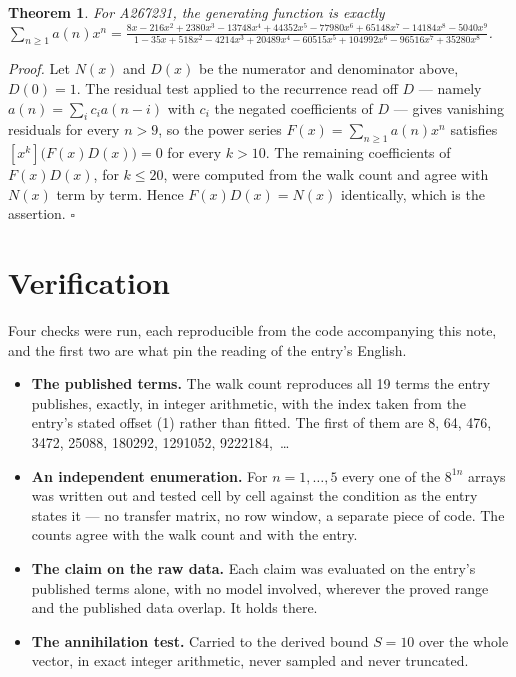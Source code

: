 \documentclass[11pt]{article}
\newtheorem{theorem}{Theorem}
\theoremstyle{definition}
\begin{document}
\begin{theorem} For A267231, the generating function is exactly $\sum_{n\ge 1} a(n)x^n = \frac{8x - 216x^{2} + 2380x^{3} - 13748x^{4} + 44352x^{5} - 77980x^{6} + 65148x^{7} - 14184x^{8} - 5040x^{9}}{1 - 35x + 518x^{2} - 4214x^{3} + 20489x^{4} - 60515x^{5} + 104992x^{6} - 96516x^{7} + 35280x^{8}}$.\end{theorem}

{\itshape Proof.} Let $N(x)$ and $D(x)$ be the numerator and denominator above, $D(0)=1$. The residual test applied to the recurrence read off $D$ --- namely $a(n) = \sum_i c_i a(n-i)$ with $c_i$ the negated coefficients of $D$ --- gives vanishing residuals for every $n > 9$, so the power series $F(x)=\sum_{n\ge 1}a(n)x^n$ satisfies $[x^k]\bigl(F(x)D(x)\bigr) = 0$ for every $k > 10$. The remaining coefficients of $F(x)D(x)$, for $k \le 20$, were computed from the walk count and agree with $N(x)$ term by term. Hence $F(x)D(x) = N(x)$ identically, which is the assertion. $\square$

\section{Verification}

Four checks were run, each reproducible from the code accompanying this note, and the first two are what pin the reading of the entry's English.

\begin{itemize}

\item {\bfseries The published terms.} The walk count reproduces all 19 terms the entry publishes, exactly, in integer arithmetic, with the index taken from the entry's stated offset (1) rather than fitted. The first of them are 8, 64, 476, 3472, 25088, 180292, 1291052, 9222184,~\dots

\item {\bfseries An independent enumeration.} For $n = 1,\dots,5$ every one of the $8^{1n}$ arrays was written out and tested cell by cell against the condition as the entry states it --- no transfer matrix, no row window, a separate piece of code. The counts agree with the walk count and with the entry.

\item {\bfseries The claim on the raw data.} Each claim was evaluated on the entry's published terms alone, with no model involved, wherever the proved range and the published data overlap. It holds there.

\item {\bfseries The annihilation test.} Carried to the derived bound $S = 10$ over the whole vector, in exact integer arithmetic, never sampled and never truncated.

\end{itemize}
\end{document}
